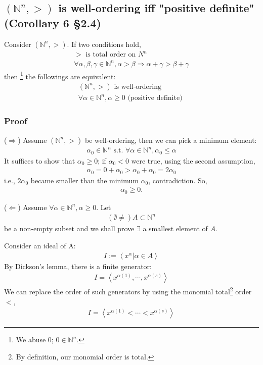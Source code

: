 \documentclass[11pt]{book}
\begin{document}
\subsection{$(\mathbb{N}^n, >)$ is well-ordering iff "positive definite" (Corollary 6 \S2.4)}
\label{WellOrderingIffPD}
Consider $(\mathbb{N}^n, >)$.
If two conditions hold, 
\begin{eqnarray}
> \text{ is total order on $N^n$} \\
\forall \alpha,\beta,\gamma \in \mathbb{N}^n, \alpha > \beta \Rightarrow \alpha + \gamma > \beta + \gamma
\end{eqnarray}
then \footnote{We abuse 0; $0 \in \mathbb{N}^n$.} the followings are equivalent:
\begin{eqnarray}
\label{simpleWOProperty}
(\mathbb{N}^n, >) \text{ is well-ordering } \\ 
\forall \alpha \in \mathbb{N}^n, \alpha \geq 0 \text{ (positive definite) }
\end{eqnarray}

\subsubsection{Proof}
($\Rightarrow$)
Assume $(\mathbb{N}^n, >)$ be well-ordering, then we can pick a minimum element:
\begin{eqnarray}
\alpha_0 \in \mathbb{N}^n \text{ s.t. } \forall \alpha \in \mathbb{N}^n, \alpha_0 \leq \alpha
\end{eqnarray}
It suffices to show that $\alpha_0 \geq 0$; if $\alpha_0 < 0$ were true, using the second assumption,
\begin{eqnarray}
\alpha_0 = 0 + \alpha_0 > \alpha_0 + \alpha_0 = 2\alpha_0
\end{eqnarray}
i.e., $2\alpha_0$ became smaller than the minimum $\alpha_0$, contradiction.
So,
\begin{eqnarray}
\alpha_0 \geq 0.
\end{eqnarray}

($\Leftarrow$)
Assume $\forall \alpha \in \mathbb{N}^n, \alpha \geq 0$.
Let
\begin{eqnarray}
(\emptyset \neq )A \subset \mathbb{N}^n
\end{eqnarray}
be a non-empty subset and we shall prove $\exists$ a smallest element of $A$.

Consider an ideal of A:
\begin{eqnarray}
I := \left< \left. x^\alpha \right| \alpha \in A\right> 
\end{eqnarray}
By Dickson's lemma, there is a finite generator:
\begin{eqnarray}
I = \left< x^{\alpha(1)}, \cdots, x^{\alpha(s)} \right> 
\end{eqnarray}
We can replace the order of such generators by using the monomial total\footnote{By definition, our monomial order is total.} order $<$, 
\begin{eqnarray}
I = \left< x^{\alpha(1)} < \cdots< x^{\alpha(s)} \right> 
\end{eqnarray}
\end{document}
